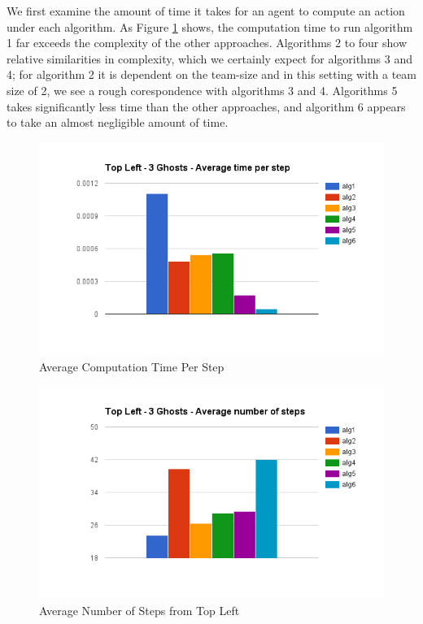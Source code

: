 \documentclass[11pt]{article}
\begin{document}
We first examine the amount of time it takes for an agent to compute an action under each algorithm. As Figure \ref{fig:averagecomputation} shows, the computation time to run algorithm 1 far exceeds the complexity of the other approaches. Algorithms 2 to four show relative similarities in complexity, which we certainly expect for algorithms 3 and 4; for algorithm 2 it is dependent on the team-size and in this setting with a team size of 2, we see a rough corespondence with algorithms 3 and 4. Algorithms 5 takes significantly less time than the other approaches, and algorithm 6 appears to take an almost negligible amount of time. 
\begin{figure}[H]
	\includegraphics[scale=0.45]{time.png}
	\caption{Average Computation Time Per Step}
	\label{fig:averagecomputation}
\end{figure}	
\begin{figure}[H]
	\includegraphics[scale=0.45]{leftsteps.png}
	\caption{Average Number of Steps from Top Left}
	\label{fig:averagenumstepsleft}
\end{figure}
\end{document}
